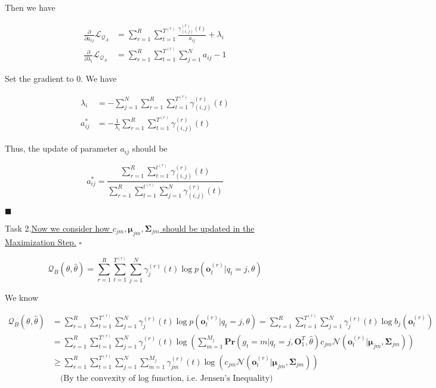 \documentclass{article}
\renewcommand{\qedsymbol}{\hfill $\blacksquare$\par}
\newcommand{\whiteqed}{\hfill $\square$\par}
\renewcommand{\Pr}[1]{\mathbf{Pr}\left(#1\right)}
\begin{document}
    Then we have
    
    \vspace{-3em}
    \begin{align*}
        \frac{\partial}{\partial a_{ij}}\mathcal{L}_{\mathcal{Q}_A}&=\sum_{r=1}^R\sum_{t=1}^{T^{(r)}}\frac{\gamma_{(i,j)}^{(r)}(t)}{a_{ij}}+\lambda_i \\
        \frac{\partial}{\partial\lambda_i}\mathcal{L}_{\mathcal{Q}_A}&= \sum_{r=1}^R\sum_{t=1}^{T^{(r)}}\sum_{j=1}^N{a_{ij}}-1
    \end{align*}
    
    Set the gradient to 0. We have
    
    \vspace{-2em}
    \begin{align*}
        \lambda_i&=-\sum_{j=1}^N\sum_{r=1}^R\sum_{t=1}^{T^{(r)}}\gamma_{(i,j)}^{(r)}(t)   \\
        a^*_{ij}&=-\frac{1}{\lambda_i}\sum_{r=1}^R\sum_{t=1}^{T^{(r)}}\gamma_{(i,j)}^{(r)}(t)
    \end{align*}
    
    Thus, the update of parameter $a_{ij}$ should be
    
    $$a_{ij}^* = \frac{\sum_{r=1}^R\sum_{t=1}^{t^{(r)}}\gamma_{(i,j)}^{(r)}(t)}{\sum_{r=1}^R\sum_{t=1}^{t^{(r)}}\sum_{j=1}^{N}\gamma_{(i,j)}^{(r)}(t)}$$ 
    
    \vspace{-3.6em} \qedsymbol
    
    \vspace{4.5em}
    \hspace{-4.5em} Task 2.\quad\underline{Now we consider how $c_{jm},\boldsymbol{\mu}_{jm},\boldsymbol{\Sigma}_{jm}$ should be updated in the Maximization Step.} \whiteqed
    
    \vspace{-0.5em}
    $$\mathcal{Q}_B(\theta,\hat{\theta}) = \sum_{r=1}^R\sum_{t=1}^{T^{(r)}}\sum_{j=1}^N\gamma_j^{(r)}(t)\log p\left(\mathbf{o}^{(r)}_t|q_t=j,\theta\right)$$
    
    \vspace{-1.5em}
    We know
    
    \vspace{-2.7em}
    \begin{align*}
        \mathcal{Q}_B(\theta,\hat{\theta}) &= \sum_{r=1}^R\sum_{t=1}^{T^{(r)}}\sum_{j=1}^N\gamma_j^{(r)}(t)\log p\left(\mathbf{o}^{(r)}_t|q_t=j,\theta\right) = \sum_{r=1}^R\sum_{t=1}^{T^{(r)}}\sum_{j=1}^N\gamma_j^{(r)}(t)\log b_j\left(\mathbf{o}^{(r)}_t\right) \\
        &= \sum_{r=1}^R\sum_{t=1}^{T^{(r)}}\sum_{j=1}^N\gamma_{j}^{(r)}(t)\log\left(\sum_{m=1}^{M_j}\Pr{g_t=m|q_t=j,\mathbf{O}_1^T,\hat{\theta}} c_{jm}\mathcal{N}\left(\mathbf{o}^{(r)}_t|\boldsymbol{\mu}_{jm},\boldsymbol{\Sigma}_{jm}\right)\right) \\
        &\geq \sum_{r=1}^R\sum_{t=1}^{T^{(r)}}\sum_{j=1}^N\sum_{m=1}^{M_j}\gamma_{jm}^{(r)}(t)\log\left( c_{jm}\mathcal{N}\left(\mathbf{o}^{(r)}_t|\boldsymbol{\mu}_{jm},\boldsymbol{\Sigma}_{jm}\right)\right)\\
        &\quad\text{(By the convexity of log function, i.e. Jensen's Inequality)}
    \end{align*}
    
\end{document}
